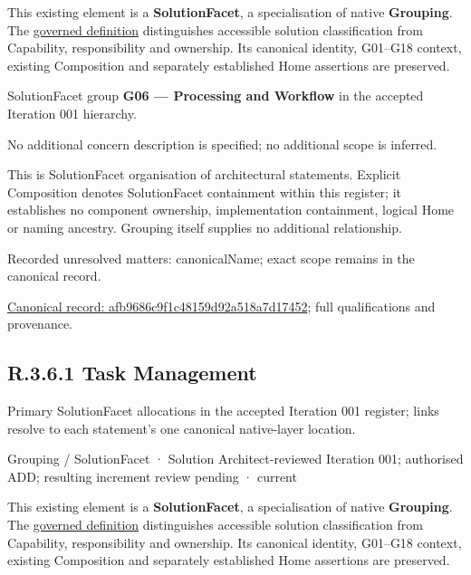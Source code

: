 This existing element is a \textbf{SolutionFacet}, a specialisation of native
\textbf{Grouping}. The \href{\detokenize{../../../../../../../governance/continuum-representation.md#solutionfacet-classification--1119-candidate}}{governed definition}
distinguishes accessible solution classification from Capability, responsibility
and ownership. Its canonical identity, G01–G18 context, existing Composition
and separately established Home assertions are preserved.



SolutionFacet group \textbf{G06 — Processing and Workflow} in the accepted Iteration 001 hierarchy.



No additional concern description is specified; no additional scope is inferred.



This is SolutionFacet organisation of architectural statements. Explicit Composition denotes SolutionFacet containment within this register; it establishes no component ownership, implementation containment, logical Home or naming ancestry. Grouping itself supplies no additional relationship.


{\small Recorded unresolved matters: canonicalName; exact scope remains in the canonical record.}\par
{\footnotesize \href{../../../../../../../continuum/grouping/afb9686c9f1c48159d92a518a7d17452.md}{Canonical record: afb9686c9f1c48159d92a518a7d17452}; full qualifications and provenance.}\par
\subsection*{R.3.6.1 Task Management}
\label{navigation:R.3.6.1}

Primary SolutionFacet allocations in the accepted Iteration 001 register; links resolve to each statement’s one canonical native-layer location.\par
\label{element:0b6d5f58354040189b3a9a30a9b913d9}
{\small Grouping / SolutionFacet · Solution Architect-reviewed Iteration 001; authorised ADD; resulting increment review pending · current}\par

This existing element is a \textbf{SolutionFacet}, a specialisation of native
\textbf{Grouping}. The \href{\detokenize{../../../../../../../governance/continuum-representation.md#solutionfacet-classification--1119-candidate}}{governed definition}
distinguishes accessible solution classification from Capability, responsibility
and ownership. Its canonical identity, G01–G18 context, existing Composition
and separately established Home assertions are preserved.



